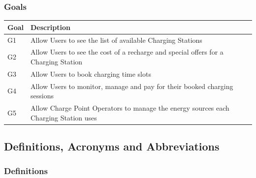 \documentclass[11pt]{article}
\begin{document}

\subsubsection{Goals}

\begin{table}[H]
    \centering
    \setlength{\tabcolsep}{18pt}
    \renewcommand{\arraystretch}{1.2}
    \begin{tabularx}{\textwidth}{|>{\centering\hsize=0.3\hsize}X|>{\hsize=1.7\hsize}X|}
        \hline
        \textbf{Goal} & \textbf{Description} \\
        \hline
        G1 & Allow Users to see the list of available Charging Stations \\
        \hline
        G2 & Allow Users to see the cost of a recharge and special offers for a Charging Station \\
        \hline
        G3 & Allow Users to book charging time slots \\
        \hline
        G4 & Allow Users to monitor, manage and pay for their booked charging sessions \\
        \hline
        G5 & Allow Charge Point Operators to manage the energy sources each Charging Station uses \\
        \hline
    \end{tabularx}
    \label{tab:goals}
\end{table}

\subsection{Definitions, Acronyms and Abbreviations}

\subsubsection{Definitions}
\end{document}
